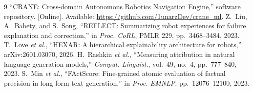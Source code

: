 \documentclass[conference]{IEEEtran}
\begin{document}
\begin{thebibliography}{9}\footnotesize
{} ``CRANE: Cross-domain Autonomous Robotics Navigation Engine,'' software repository. [Online]. Available: \url{https://github.com/1unarzDev/crane_ml}.
 Z.~Liu, A.~Bahety, and S.~Song, ``REFLECT: Summarizing robot experiences for failure explanation and correction,'' in \emph{Proc. CoRL}, PMLR 229, pp.~3468--3484, 2023.
 T.~Love \emph{et al.}, ``HEXAR: A hierarchical explainability architecture for robots,'' arXiv:2601.03070, 2026.
 H.~Rashkin \emph{et al.}, ``Measuring attribution in natural language generation models,'' \emph{Comput. Linguist.}, vol.~49, no.~4, pp.~777--840, 2023.
 S.~Min \emph{et al.}, ``FActScore: Fine-grained atomic evaluation of factual precision in long form text generation,'' in \emph{Proc. EMNLP}, pp.~12076--12100, 2023.
\end{thebibliography}
\end{document}
